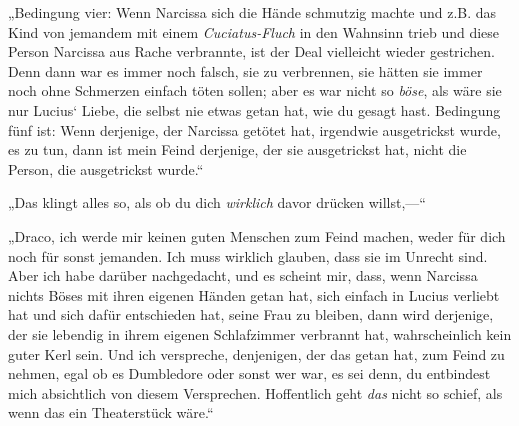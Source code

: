 „Bedingung vier: Wenn Narcissa sich die Hände schmutzig machte und z.B. das Kind von jemandem mit einem \emph{Cuciatus-Fluch} in den Wahnsinn trieb und diese Person Narcissa aus Rache verbrannte, ist der Deal vielleicht wieder gestrichen. Denn dann war es immer noch falsch, sie zu verbrennen, sie hätten sie immer noch ohne Schmerzen einfach töten sollen; aber es war nicht so \emph{böse}, als wäre sie nur Lucius‘ Liebe, die selbst nie etwas getan hat, wie du gesagt hast. Bedingung fünf ist: Wenn derjenige, der Narcissa getötet hat, irgendwie ausgetrickst wurde, es zu tun, dann ist mein Feind derjenige, der sie ausgetrickst hat, nicht die Person, die ausgetrickst wurde.“

„Das klingt alles so, als ob du dich \emph{wirklich} davor drücken willst,—“

„Draco, ich werde mir keinen guten Menschen zum Feind machen, weder für dich noch für sonst jemanden. Ich muss wirklich glauben, dass sie im Unrecht sind. Aber ich habe darüber nachgedacht, und es scheint mir, dass, wenn Narcissa nichts Böses mit ihren eigenen Händen getan hat, sich einfach in Lucius verliebt hat und sich dafür entschieden hat, seine Frau zu bleiben, dann wird derjenige, der sie lebendig in ihrem eigenen Schlafzimmer verbrannt hat, wahrscheinlich kein guter Kerl sein. Und ich verspreche, denjenigen, der das getan hat, zum Feind zu nehmen, egal ob es Dumbledore oder sonst wer war, es sei denn, du entbindest mich absichtlich von diesem Versprechen. Hoffentlich geht \emph{das} nicht so schief, als wenn das ein Theaterstück wäre.“

